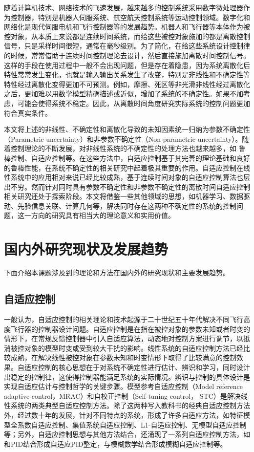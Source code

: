 随着计算机技术、网络技术的飞速发展，越来越多的控制系统采用数字微处理器作为控制器，特别是机器人伺服系统、航空航天控制系统等运动控制领域。数字化和网络化是现代伺服电机和飞行控制器等的发展趋势。机器人和飞行器等本体作为被控对象，从本质上来说都是连续时间系统，而给这些被控对象施加的都是离散控制信号，只是采样时间很短，通常在毫秒级别。为了简化，在给这些系统设计控制律的时候，常常借助于连续时间控制理论去设计，然后直接施加离散时间控制信号。这样的手段在使用过程中一般不会出现问题，但是存在着隐患，因为系统离散化后特性常常发生变化，也就是输入输出关系发生了改变，特别是非线性和不确定性等特性经过离散化变得更加不可预测。例如，摩擦、死区等非光滑非线性经过离散化之后，更加难以用数学模型精确描述或近似，增加了系统的不确定性。如果不加考虑，可能会使得系统不稳定。因此，从离散时间角度研究实际系统的控制问题更加符合真实条件。

本文将上述的非线性、不确定性和离散化导致的未知因素统一归纳为参数不确定性（Parametric uncertainty）和非参数不确定性（Non-parametric uncertainty）。随着控制理论的不断发展，对非线性系统的不确定性的处理方法也越来越多，如 鲁棒控制、自适应控制等。在这些方法中，自适应控制基于其完善的理论基础和良好的鲁棒性能，在系统不确定性的相关研究中起着极其重要的作用。自适应控制在线性系统中的应用相对来说已经比较成熟，基于连续时间对象的自适应控制算法也层出不穷。然而针对同时具有参数不确定性和非参数不确定性的离散时间自适应控制相关研究还处于探索阶段。本文将借鉴一些其他领域的思想，如机器学习、数据驱动、先验信息关联、计算几何等，解决同时存在这两种不确定性的系统的控制问题，这一方向的研究具有相当大的理论意义和实用价值。

\section{国内外研究现状及发展趋势}\label{sect:1.2}
下面介绍本课题涉及到的理论和方法在国内外的研究现状和主要发展趋势。
\subsection{自适应控制}%

一般认为，自适应控制的相关理论和技术起源于二十世纪五十年代解决不同飞行高度飞行器的控制器设计问题。自适应控制是在指在被控对象的参数未知或者时变的情形下，在常规反馈控制器中引入自适应算法，动态地对控制方案进行调节，以抵消被控对象的模型时变或受到较大干扰的影响。线性系统的自适应控制方法已经比较成熟，在解决线性被控对象在参数未知和时变情形下取得了比较满意的控制效果。自适应控制的核心思想在于对系统不确定性进行估计、辨识和学习，同时设计出稳定的控制律，这使得控制器能满足系统的实际情况。辨识与控制的具体设计是实现自适应估计与控制哲学的关键步骤。模型参考自适应控制（Model reference adaptive control，MRAC）和自校正控制（Self-tuning control， STC）是解决线性系统的两类典型自适应控制方法。除了这两种写入教科书的经典自适应控制方法外，经过数十年的发展，针对不同特点的系统，形成了许多自适应方法，如特征模型全系数自适应控制、集值系统自适应控制、L1-自适应控制、无模型自适应控制等；另外，自适应控制思想与其他方法结合，还涌现了一系列自适应控制方法，如和PID结合形成自适应PID整定，与模糊数学结合形成模糊自适应控制等。

